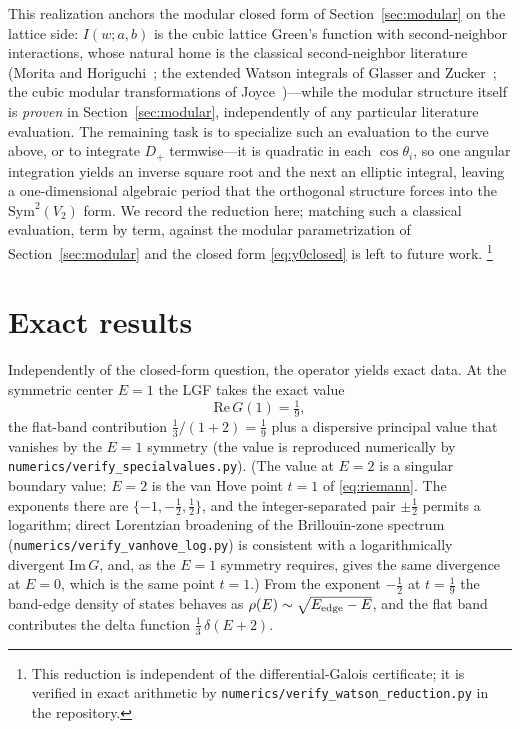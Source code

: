 \documentclass[cntp]{ipart}
\theoremstyle{plain}
\theoremstyle{remark}
\begin{document}
This realization anchors the modular closed form of Section~\ref{sec:modular} on the lattice side: $I(w;a,b)$ is
the cubic lattice Green's function with second-neighbor interactions, whose natural home is the classical
second-neighbor literature (Morita and Horiguchi~\cite{MoritaHoriguchi1971}; the extended Watson integrals of
Glasser and Zucker~\cite{GlasserZucker1977}; the cubic modular transformations of Joyce~\cite{Joyce1998})---while the modular structure itself is \emph{proven} in
Section~\ref{sec:modular}, independently of any particular literature evaluation. The remaining task is to specialize such an evaluation to the curve above, or to integrate
$D_+$ termwise---it is quadratic in each $\cos\theta_i$, so one angular integration yields an inverse square root
and the next an elliptic integral, leaving a one-dimensional algebraic period that the orthogonal structure forces
into the $\mathrm{Sym}^2(V_2)$ form. We record the reduction here; matching such a classical evaluation, term by
term, against the modular parametrization of Section~\ref{sec:modular} and the closed form \eqref{eq:y0closed} is
left to future work.%
\footnote{This reduction is independent of the differential-Galois certificate; it is verified in exact
arithmetic by \texttt{numerics/verify\_watson\_reduction.py} in the repository.}

\section{Exact results}
Independently of the closed-form question, the operator yields exact data. At the symmetric center $E=1$ the LGF
takes the exact value
\begin{equation}
\mathrm{Re}\,G(1)=\tfrac19,
\end{equation}
the flat-band contribution $\tfrac13/(1+2)=\tfrac19$ plus a dispersive principal value that vanishes by the
$E=1$ symmetry (the value is reproduced numerically by \texttt{numerics/verify\_specialvalues.py}). (The value at $E=2$ is a singular boundary value: $E=2$ is the van Hove point $t=1$ of
\eqref{eq:riemann}. The exponents there are $\{-1,-\tfrac12,\tfrac12\}$, and the integer-separated pair
$\pm\tfrac12$ permits a logarithm; direct Lorentzian broadening of the Brillouin-zone spectrum
(\texttt{numerics/verify\_vanhove\_log.py}) is consistent with a logarithmically divergent
$\mathrm{Im}\,G$, and, as the $E=1$ symmetry requires, gives the same divergence at $E=0$, which is the same
point $t=1$.) From the exponent $-\tfrac12$ at
$t=\tfrac19$ the band-edge density of states behaves as $\rho(E)\sim\sqrt{E_{\rm edge}-E}$, and the flat band
contributes the delta function $\tfrac13\,\delta(E+2)$.
\end{document}
